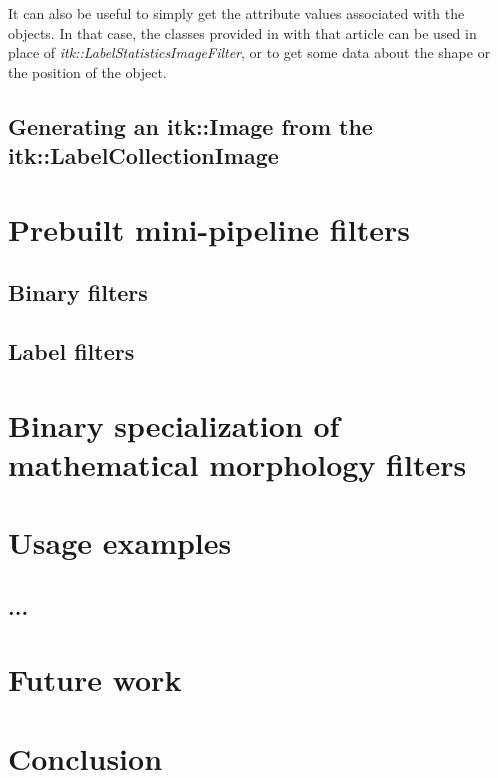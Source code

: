 \documentclass{InsightArticle}
\begin{document}
It can also be useful to simply get the attribute values associated with the objects. In that case, the classes provided in with that article can be used in place of {\em itk::LabelStatisticsImageFilter}, or to get some data about the shape or the position of the object.

\subsection{Generating an itk::Image from the itk::LabelCollectionImage}

\section{Prebuilt mini-pipeline filters}

\subsection{Binary filters}

\subsection{Label filters}

\section{Binary specialization of mathematical morphology filters}

\section{Usage examples}

\subsection{...}


\section{Future work}

\section{Conclusion}


\end{document}
